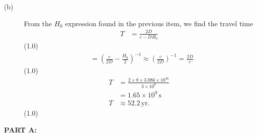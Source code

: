\begin{description}
\item[(b)] From the $H_0$ expression found in the previous item, we find
  the travel time
  \begin{align*}
  T &= \frac{2D}{c - DH_0}
  \end{align*}
  \hfill(1.0)
  \begin{align*}
  &= \left(\frac{c}{2D} - \frac{H_0}{2}\right)^{-1}
   \approx \left(\frac{c}{2D}\right)^{-1} = \frac{2D}{c}
  \end{align*}
  \hfill(1.0)
  \begin{align*}
  T &= \frac{2\times 8\times 3.086\times 10^{16}}{3\times 10^{8}}\\
    &= 1.65\times 10^{9}\,\mathrm{s}\\
  T &\approx 52.2\,\mathrm{yr}.
  \end{align*}
  \hfill(1.0)
\end{description}

\textbf{PART A:}

